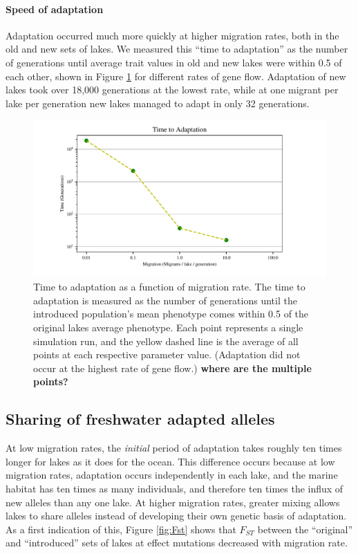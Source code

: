 \documentclass{article}
\begin{document}
\paragraph*{Speed of adaptation}
Adaptation occurred much more quickly
at higher migration rates,
both in the old and new sets of lakes.
We measured this ``time to adaptation''
as the number of generations until 
average trait values in old and new lakes were within 0.5 of each other,
shown in Figure \ref{fig:TimeToAdaptation} for different rates of gene flow.
Adaptation of new lakes took over 18,000 generations at the lowest rate,
while at one migrant per lake per generation
new lakes managed to adapt in only 32 generations. 

\begin{figure}
	\begin{center}
  		\includegraphics{Final_Plots/Time_Adapt.pdf}
  		\caption{
		Time to adaptation as a function of migration rate.
        The time to adaptation is measured as the number of generations until
		the introduced population's mean phenotype 
        comes within 0.5 of the original lakes average phenotype. 
		Each point represents a single simulation run,
		and the yellow dashed line is the average of all points at each respective parameter value.
        (Adaptation did not occur at the highest rate of gene flow.)
        \textbf{where are the multiple points?}
        } \label{fig:TimeToAdaptation}
	\end{center}
\end{figure}


\subsection*{Sharing of freshwater adapted alleles}

At low migration rates, the \emph{initial} period of adaptation
takes roughly ten times longer for lakes as it does for the ocean.
This difference occurs because at low migration rates, 
adaptation occurs independently in each lake,
and the marine habitat has ten times as many individuals,
and therefore ten times the influx of new alleles than any one lake. 
At higher migration rates, greater mixing
allows lakes to share alleles instead of developing their own genetic basis of adaptation. 
As a first indication of this, Figure \ref{fig:Fst} 
shows that $F_{ST}$ between the ``original'' and ``introduced'' sets of lakes 
at effect mutations decreased with migration rate.
\end{document}

